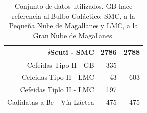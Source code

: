 \documentclass{beamer}
\begin{document}
\begin{frame}
\begin{table}
{\begin{tabular}{rrr}
        \hline
        $\delta$Scuti - SMC\cite{poleski_optical_2010} & 2786 & 2788\\
        \hline
        Cefeidas Tipo II - GB \cite{soszynski_optical_2013}& 335 & \\
        Cefeidas Tipo II - LMC \cite{soszynski_optical_2010-1}& 43 & 603\\
        Cefeidas Tiplo II - LMC \cite{soszynski_optical_2008}& 197 & \\
        \hline
        Cadidatas a Be -  Vía Láctea  & 475 & 475\\
        \hline
        \hline 
      \end{tabular}
    } 
    \caption{Conjunto de datos utilizados. GB hace referencia al Bulbo Galáctico; SMC, a la Pequeña Nube de Magallanes y LMC, a la Gran Nube de Magallanes. }
    \label{cuadro:datosUsados}
  \end{table}

\end{frame}
\end{document}
